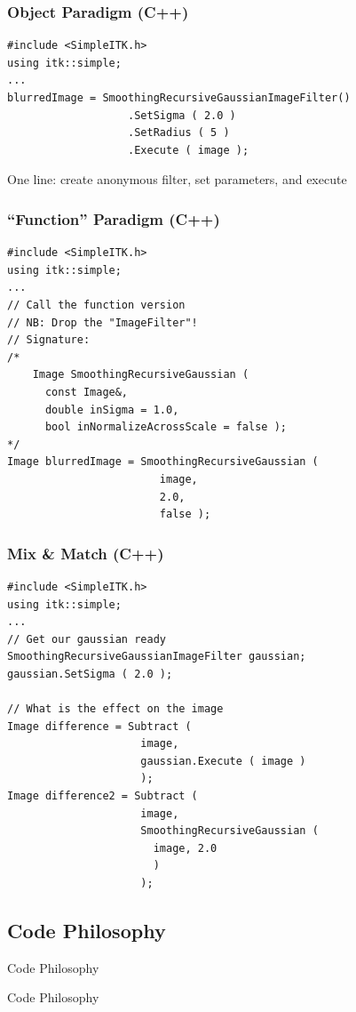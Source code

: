 \begin{frame}[fragile]
\frametitle{Object Paradigm (C++)}
\lstcpp
\begin{lstlisting}
#include <SimpleITK.h>
using itk::simple;
...
blurredImage = SmoothingRecursiveGaussianImageFilter()
                   .SetSigma ( 2.0 )
                   .SetRadius ( 5 )
                   .Execute ( image );
\end{lstlisting}
One line: create anonymous filter, set parameters, and execute
\end{frame}

\begin{frame}[fragile]
\frametitle{``Function'' Paradigm (C++)}
\lstcpp
\begin{lstlisting}
#include <SimpleITK.h>
using itk::simple;
...
// Call the function version
// NB: Drop the "ImageFilter"!
// Signature:
/*
    Image SmoothingRecursiveGaussian (
      const Image&,
      double inSigma = 1.0,
      bool inNormalizeAcrossScale = false );
*/
Image blurredImage = SmoothingRecursiveGaussian (
                        image,
                        2.0,
                        false );
\end{lstlisting}
\end{frame}

\begin{frame}[fragile]
\frametitle{Mix \& Match (C++)}
\lstcpp
\begin{lstlisting}
#include <SimpleITK.h>
using itk::simple;
...
// Get our gaussian ready
SmoothingRecursiveGaussianImageFilter gaussian;
gaussian.SetSigma ( 2.0 );

// What is the effect on the image
Image difference = Subtract (
                     image,
                     gaussian.Execute ( image )
                     );
Image difference2 = Subtract (
                     image,
                     SmoothingRecursiveGaussian (
                       image, 2.0
                       )
                     );

\end{lstlisting}
\end{frame}



\subsection{Code Philosophy}
\begin{frame}{Code Philosophy}
\fontsize{36pt}{36pt}\selectfont
\center
\begin{center}
Code Philosophy
\end{center}
\end{frame}

